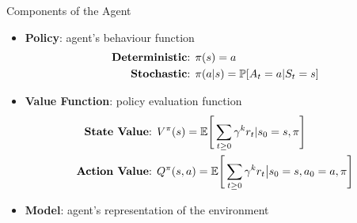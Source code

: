 \documentclass[aspectratio=169]{beamer}
\begin{document}
\begin{frame}{Components of the Agent}
	\begin{itemize}
		\item{\textbf{Policy}:  agent’s behaviour function}
		\begin{equation*}
		\begin{aligned}
		\text{\textbf{Deterministic}: } & \pi(s) = a                               \\
		\text{\textbf{Stochastic}: }    & \pi(a|s) = \mathbb{P}[A_t = a | S_t = s]
		\end{aligned}
		\end{equation*}
		\item{\textbf{Value Function}:  policy evaluation function}
		\begin{equation*}
		\begin{aligned}
		\text{\textbf{State Value}: }  & V^\pi(s) = \mathbb{E} \Bigg[\sum_{t \ge 0} \gamma^k r_t|s_0 = s, \pi\Bigg]                  \\
		\text{\textbf{Action Value}: } & Q^\pi(s,a) = \mathbb{E} \Bigg[\sum_{t \ge 0} \gamma^k r_t \big| s_0 = s, a_0 = a, \pi\Bigg] \\
		\end{aligned}
		\end{equation*}
		\item{\textbf{Model}:  agent’s representation of the environment}
	\end{itemize}
	
\end{frame}
\end{document}
